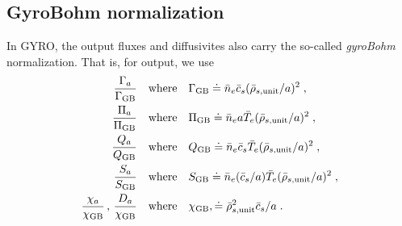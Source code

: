 \subsection{GyroBohm normalization}

In GYRO, the output fluxes and diffusivites also carry the so-called 
{\it gyroBohm} normalization.  That is, for output, we use
%
\begin{align}
\frac{\Gamma_a}{\Gamma_{\rm GB}} & \quad \mbox{where} \quad 
 \Gamma_{\rm GB} \doteq {\bar n}_e {\bar c}_s (\bar{\rho}_{s,{\rm unit}}/a)^2 \; , \\
\frac{\Pi_a}{\Pi_{\rm GB}} & \quad \mbox{where} \quad
 \Pi_{\rm GB} \doteq {\bar n}_e a {\bar T}_e (\bar{\rho}_{s,{\rm unit}}/a)^2 \; , \\
\frac{Q_a}{Q_{\rm GB}} & \quad \mbox{where} \quad
 Q_{\rm GB} \doteq {\bar n}_e {\bar c}_s {\bar T}_e (\bar{\rho}_{s,{\rm unit}}/a)^2 \; , \\
\frac{S_a}{S_{\rm GB}} & \quad \mbox{where} \quad
S_{\rm GB} \doteq {\bar n}_e ({\bar c}_s/a) {\bar T}_e (\bar{\rho}_{s,{\rm unit}}/a)^2 \; , \\
\frac{\chi_a}{\chi_{\rm GB}} \, , \, \frac{D_a}{\chi_{\rm GB}}
& \quad \mbox{where} \quad \chi_{\rm GB}, \doteq \bar{\rho}_{s,{\rm unit}}^2 {\bar c}_s/a \; .
\end{align}

